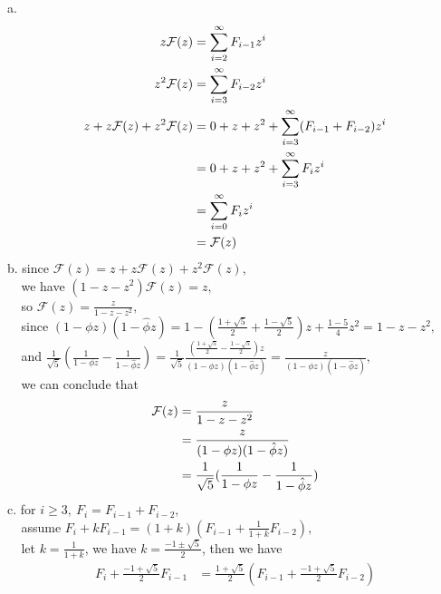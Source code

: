 \documentclass[12pt, a4paper, UTF8]{ctexart}
\begin{document}
\begin{solution}
  a. 
  \begin{align}
      z \mathcal{F}(z) & = \sum_{i = 2}^{\infty} F_{i - 1}z^{i} \notag \\
      z^{2} \mathcal{F}(z) & = \sum_{i = 3}^{\infty} F_{i - 2}z^{i} \notag \\
      z + z \mathcal{F}(z) + z^{2} \mathcal{F}(z) & = 0 + z + z^{2} 
      + \sum_{i = 3}^{\infty} (F_{i - 1} + F_{i - 2})z^{i} \notag \\
                       & = 0 + z + z^{2} + \sum_{i = 3}^{\infty} F_{i}z^{i} \notag \\
                       & = \sum_{i = 0}^{\infty} F_{i}z^{i} \notag \\
                       & = \mathcal{F}(z) \notag
  \end{align}
  b. since $\mathcal{F}(z) = z + z\mathcal{F}(z) + z^{2}\mathcal{F}(z),$\\
  $~~~~~$we have $(1 - z - z^{2})\mathcal{F}(z) = z,$\\
  $~~~~~$so $\mathcal{F}(z) = \frac{z}{1 - z - z^{2}},$\\
  $~~~~~$since $(1 - \phi z)(1 - \hat{\phi}z) = 1 - (\frac{1 + \sqrt{5}}{2} + \frac{1 - \sqrt{5}}{2})z 
                + \frac{1 - 5}{4}z^{2} = 1 - z - z^{2},$\\
  $~~~~~$and $\frac{1}{\sqrt{5}}(\frac{1}{1 - \phi z} - \frac{1}{1 - \hat{\phi}z}) 
              = \frac{1}{\sqrt{5}} \frac{(\frac{1 + \sqrt{5}}{2} - \frac{1 - \sqrt{5}}{2})z}{(1 - \phi z)(1 - \hat{\phi}z)} 
              = \frac{z}{(1 - \phi z)(1 - \hat{\phi}z)},$\\
  $~~~~~$we can conclude that
  \begin{align}
    \mathcal{F}(z) & = \frac{z}{1 - z - z^{2}} \notag \\
                   & = \frac{z}{(1 - \phi z)(1 - \hat{\phi}z)} \notag \\
                   & = \frac{1}{\sqrt{5}}(\frac{1}{1 - \phi z} - \frac{1}{1 - \hat{\phi}z}) \notag
  \end{align}
  c. for $i \geq 3,~F_{i} = F_{i - 1} + F_{i - 2},$\\
  $~~~~~$assume $F_{i} + kF_{i - 1} = (1 + k)(F_{i - 1} + \frac{1}{1 + k}F_{i - 2}),$\\
  $~~~~~$let $k = \frac{1}{1 + k}$, we have $k = \frac{-1 \pm \sqrt{5}}{2}$, then we have
  \begin{align}
      F_{i} + \frac{-1 + \sqrt{5}}{2}F_{i - 1} & = \frac{1 + \sqrt{5}}{2}(F_{i - 1} + \frac{-1 + \sqrt{5}}{2}F_{i - 2}) \\

\end{align}
\end{solution}
\end{document}
